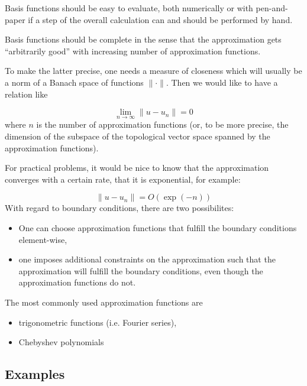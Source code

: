 \documentclass[preprint, 5p, 10pt]{elsarticle}
\theoremstyle{plain}
\begin{document}
Basis functions should be easy to evaluate, both numerically or with pen-and-paper if a step of the overall calculation can and should be performed by hand.

Basis functions should be complete in the sense that the approximation gets ``{}arbitrarily good''{} with increasing number of approximation functions.

To make the latter precise, one needs a measure of closeness which will usually be a norm of a Banach space of functions $\| \cdot \|$. Then we would like to have a relation like

\begin{displaymath}
\lim_{n \to \infty} \| u - u_n \| = 0
\end{displaymath}
where $n$ is the number of approximation functions (or, to be more precise, the dimension of the subspace of the topological vector space spanned by the approximation functions).

For practical problems, it would be nice to know that the approximation converges with a certain rate, that it is exponential, for example:

\begin{displaymath}
\| u - u_n \|  = O(\exp(-n))
\end{displaymath}
With regard to boundary conditions, there are two possibilites:

\begin{itemize}%
\item One can choose approximation functions that fulfill the boundary conditions element-wise,


\item one imposes additional constraints on the approximation such that the approximation will fulfill the boundary conditions, even though the approximation functions do not.



\end{itemize}
The most commonly used approximation functions are

\begin{itemize}%
\item trigonometric functions (i.e. Fourier series),


\item Chebyshev polynomials



\end{itemize}
\subsection*{Examples}
\end{document}
